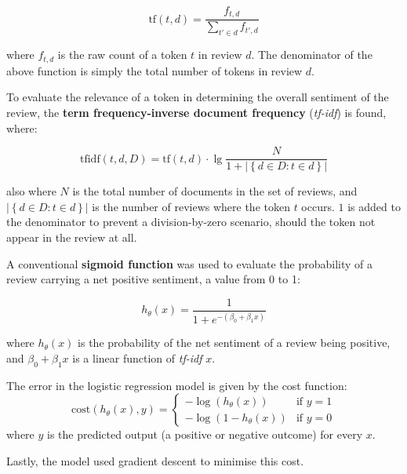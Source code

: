 \documentclass[12pt, bibliography=totocnumbered, paper=a4]{scrartcl}
\def\bf#1{\textbf{#1}}
\def\it#1{\textit{#1}}
\begin{document}
\begin{equation}
	\text{tf}(t,d) = \frac{f_{t,d}}{\sum_{t'\in d}^{}f_{t',d}}
	\label{eq:tf}
\end{equation}

where \(f_{t,d}\) is the raw count of a token \(t\) in review \(d\). The denominator of the above
function is simply the total number of tokens in review \(d\).

To evaluate the relevance of a token in determining the overall sentiment of the
review, the \bf{term frequency-inverse document frequency} (\it{tf-idf}) is found, where:

\begin{equation}
	\text{tfidf}(t,d,D) = \text{tf}(t,d)\cdot\lg\frac{N}{1+\left|\left\{d\in D : t\in d\right\}\right|}
	\label{eq:tfidf}
\end{equation}

also where \(N\) is the total number of documents in the set of reviews, and
\(\left|\left\{d\in D : t\in d\right\}\right|\) is the number of reviews where
the token \(t\) occurs. \(1\) is added to the denominator to prevent a
division-by-zero scenario, should the token not appear in the review at all.

A conventional \bf{sigmoid function} was used to evaluate the probability
of a review carrying a net positive sentiment, a value from 0 to 1:

\begin{equation}
	h_\theta(x) = \frac{1}{1+e^{-{\left(\beta_0+\beta_1x\right)}}}
	\label{eq:sigmoid}
\end{equation}

where \(h_\theta(x)\) is the probability of the net sentiment of a review being positive, and
\(\beta_0+\beta_1x\) is a linear function of \it{tf-idf} \(x\).

The error in the logistic regression model is given by the cost function:
\begin{equation}
	\text{cost}\left(h_\theta\left(x\right),y\right) = \begin{cases}
		-\log\left(h_\theta\left(x\right)\right)   & \text{if } y = 1 \\
		-\log\left(1-h_\theta\left(x\right)\right) & \text{if } y = 0
	\end{cases}
\end{equation}
where \(y\) is the predicted output (a positive or negative outcome) for every \(x\).

Lastly, the model used gradient descent to minimise this cost.
\end{document}
